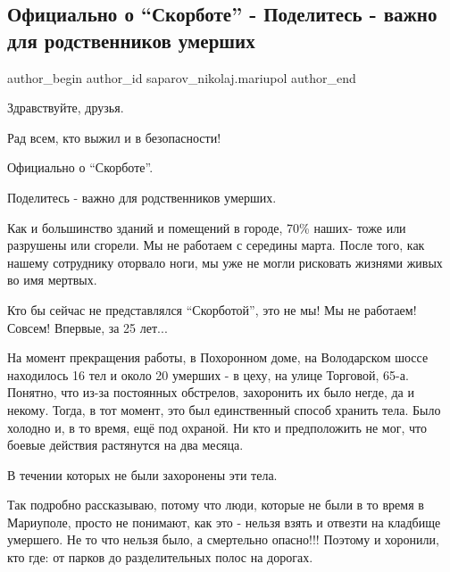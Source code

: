  
 
 
 
 

\subsection{Официально о \enquote{Скорботе} - Поделитесь - важно для родственников умерших}
\label{sec:01_06_2022.fb.saparov_nikolaj.mariupol.1.ofitsialno_o__skorbo}

\ifcmt
 author_begin
   author_id saparov_nikolaj.mariupol
 author_end
\fi

Здравствуйте, друзья. 

Рад всем, кто выжил и в безопасности!

Официально о \enquote{Скорботе}.             

Поделитесь - важно для родственников умерших.

Как и большинство зданий и помещений в городе, 70\% наших- тоже или разрушены
или сгорели. Мы не работаем с середины марта. После того, как нашему
сотруднику оторвало ноги, мы уже не могли рисковать жизнями живых во имя
мертвых. 

Кто бы сейчас не представлялся \enquote{Скорботой},  это не мы! Мы не работаем!
Совсем! Впервые, за 25 лет...

На момент прекращения работы, в Похоронном доме, на Володарском шоссе
находилось 16 тел и около 20 умерших - в цеху, на улице Торговой, 65-а. Понятно, что
из-за постоянных обстрелов, захоронить их было негде, да и некому. Тогда, в тот
момент, это был единственный способ хранить тела. Было холодно и, в то
время, ещё под охраной. Ни кто и предположить не мог, что боевые действия
растянутся на два месяца.

В течении которых не были захоронены эти тела. 

Так подробно рассказываю, потому что люди, которые не были в то время в
Мариуполе, просто не понимают, как это - нельзя взять и отвезти на кладбище
умершего. Не то что нельзя было, а смертельно опасно!!! Поэтому и хоронили, кто
где: от парков до разделительных полос на дорогах.

